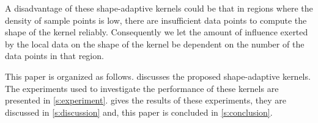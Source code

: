 	A disadvantage of these shape-adaptive kernels could be that in regions where the density of sample points is low, there are insufficient data points to compute the shape of the kernel reliably. Consequently we let the amount of influence exerted by the local data on the shape of the kernel be dependent on the number of the data points in that region.

	This paper is organized as follows.  discusses the proposed shape-adaptive kernels. The experiments used to investigate the performance of these kernels are presented in \cref{s:experiment}.  gives the results of these experiments, they are discussed in \cref{s:discussion} and, this paper is concluded in \cref{s:conclusion}.